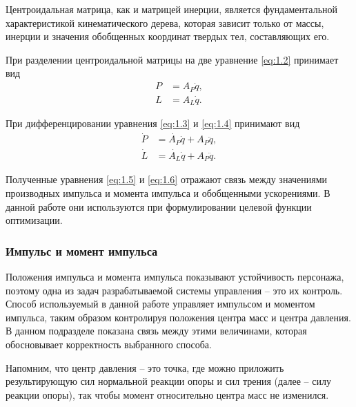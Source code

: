Центроидальная матрица, как и матрицей инерции, является фундаментальной характеристикой кинематического дерева, которая зависит только от массы, инерции и значения обобщенных координат твердых тел, составляющих его.

При разделении центроидальной матрицы на две уравнение \ref{eq:1.2} принимает вид
\begin{align*}
  P &= A_{P} \dot{q}, \tag{1.3}\label{eq:1.3} \\
  L &= A_{L} \dot{q}. \tag{1.4}\label{eq:1.4}
\end{align*}

При дифференцировании уравнения \ref{eq:1.3} и \ref{eq:1.4} принимают вид
\begin{align*}
  \dot{P} &= \dot{A_{P}} \dot{q} + A_{P} \ddot{q}, \tag{1.5}\label{eq:1.5} \\
  \dot{L} &= \dot{A_{L}} \dot{q} + A_{P} \ddot{q}. \tag{1.6}\label{eq:1.6}
\end{align*}

Полученные уравнения \ref{eq:1.5} и \ref{eq:1.6} отражают связь между значениями производных импульса и момента импульса и обобщенными ускорениями. В данной работе они используются при формулировании целевой функции оптимизации.

\subsubsection{Импульс и момент импульса}

Положения импульса и момента импульса показывают устойчивость персонажа, поэтому одна из задач разрабатываемой системы управления -- это их контроль. Способ используемый в данной работе управляет импульсом и моментом импульса, таким образом контролируя положения центра масс и центра давления. В данном подразделе показана связь между этими величинами, которая обосновывает корректность выбранного способа.

Напомним, что центр давления -- это точка, где можно приложить результирующую сил нормальной реакции опоры и сил трения (далее -- силу реакции опоры), так чтобы момент относительно центра масс не изменился.

